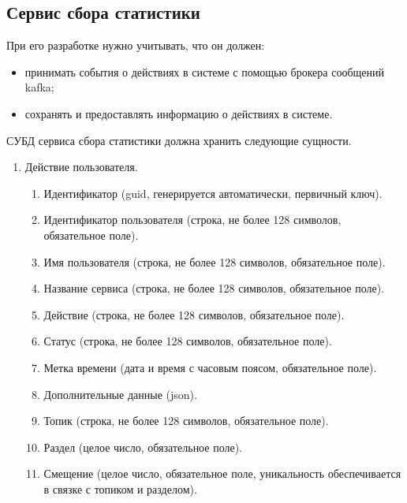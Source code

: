 \subsection{Сервис сбора статистики}
При его разработке нужно учитывать, что он должен:
\begin{itemize}
	\item принимать события о действиях в системе с помощью брокера сообщений kafka;
	\item сохранять и предоставлять информацию о действиях в системе.
\end{itemize}
СУБД сервиса сбора статистики должна хранить следующие сущности.
\begin{enumerate}
	\item Действие пользователя.
	\begin{enumerate}
		\item Идентификатор (guid, генерируется автоматически, первичный ключ).
		\item Идентификатор пользователя (строка, не более 128 символов, обязательное поле).
		\item Имя пользователя (строка, не более 128 символов, обязательное поле).
		\item Название сервиса (строка, не более 128 символов, обязательное поле).
		\item Действие (строка, не более 128 символов, обязательное поле).
		\item Статус (строка, не более 128 символов, обязательное поле).
		\item Метка времени (дата и время с часовым поясом, обязательное поле).
		\item Дополнительные данные (json).
		\item Топик (строка, не более 128 символов, обязательное поле).
		\item Раздел (целое число, обязательное поле).
		\item Смещение (целое число, обязательное поле, уникальность обеспечивается в связке с топиком и разделом).
	\end{enumerate}
\end{enumerate}



